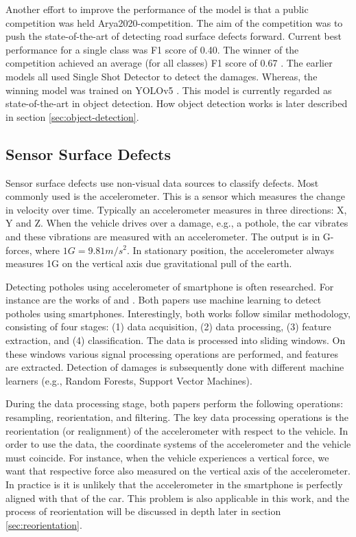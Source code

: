 Another effort to improve the performance of the model is that a public competition was held {Arya2020-competition}. The aim of the competition was to push the state-of-the-art of detecting road surface defects forward. Current best performance for a single class was F1 score of 0.40. The winner of the competition achieved an average (for all classes) F1 score of 0.67 \cite{rddc2020}. The earlier models \cite{Maeda2018,Arya2020-transfer,Maeda2020} all used Single Shot Detector to detect the damages. Whereas, the winning model was trained on YOLOv5 \cite{Jocher2021}. This model is currently regarded as state-of-the-art in object detection. How object detection works is later described in section \ref{sec:object-detection}.


\subsection{Sensor Surface Defects}
Sensor surface defects use non-visual data sources to classify defects. Most commonly used is the accelerometer. This is a sensor which measures the change in velocity over time. Typically an accelerometer measures in three directions: X, Y and Z. When the vehicle drives over a damage, e.g., a pothole, the car vibrates and these vibrations are measured with an accelerometer. The output is in G-forces, where $1 G = 9.81m/s^2$. In stationary position, the accelerometer always measures 1G on the vertical axis due gravitational pull of the earth.

Detecting potholes using accelerometer of smartphone is often researched. For instance are the works of  and . Both papers use machine learning to detect potholes using smartphones. Interestingly, both works follow similar methodology, consisting of four stages: (1) data acquisition, (2) data processing, (3) feature extraction, and (4) classification. The data is processed into sliding windows. On these windows various signal processing operations are performed, and features are extracted. Detection of damages is subsequently done with different machine learners (e.g., Random Forests, Support Vector Machines).

During the data processing stage, both papers perform the following operations: resampling, reorientation, and filtering. The key data processing operations is the reorientation (or realignment) of the accelerometer with respect to the vehicle. In order to use the data, the coordinate systems of the accelerometer and the vehicle must coincide. For instance, when the vehicle experiences a vertical force, we want that respective force also measured on the vertical axis of the accelerometer. In practice is it is unlikely that the accelerometer in the smartphone is perfectly aligned with that of the car. This problem is also applicable in this work, and the process of reorientation will be discussed in depth later in section \ref{sec:reorientation}. 


